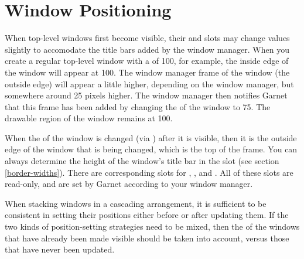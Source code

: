 \section{Window Positioning}

When top-level windows first become visible, their  and 
slots may change values slightly to accomodate the title bars added by the
window manager.  When you create a
regular top-level window with a  of 100, for example, the inside
edge of the window will appear at 100.  The window manager frame of
the window (the outside edge) will appear a little higher, depending on
the window manager, but somewhere around 25 pixels higher.
The window manager then notifies Garnet that this frame has been added by
changing the  of the window to 75.  The drawable region of the window
remains at 100.

When the  of the window is changed (via ) after it is
visible, then it is the outside edge of the window that is being changed,
which is the top of the frame.
You can always determine the height of the window's title bar in the
 slot (see section \ref{border-widths}).
There are corresponding slots for , , and
.  All of these slots are read-only,
and are set by Garnet according to your window manager.

When stacking windows in a cascading arrangement, it is
sufficient to be consistent in setting their positions either before or
after updating them.  If the two kinds of position-setting strategies need to
be mixed, then the  of the windows that have already
been made visible should be taken into account, versus those that have
never been updated.


